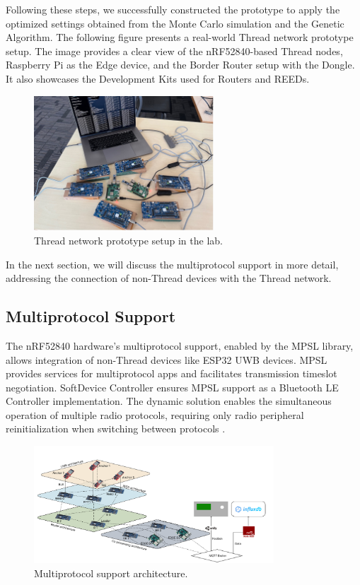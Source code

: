 Following these steps, we successfully constructed the prototype to apply the optimized settings obtained from the Monte Carlo simulation and the Genetic Algorithm. The following figure presents a real-world Thread network prototype setup. The image provides a clear view of the nRF52840-based Thread nodes, Raspberry Pi as the Edge device, and the Border Router setup with the Dongle. It also showcases the Development Kits used for Routers and REEDs.

\begin{figure}[h]
    \centering
    \includegraphics[width=0.6\textwidth]{images/research_design/prototype_setup.jpg}
    \caption{Thread network prototype setup in the lab.}
    \label{fig:prototype_setup}
\end{figure}

In the next section, we will discuss the multiprotocol support in more detail, addressing the connection of non-Thread devices with the Thread network.


\subsection{Multiprotocol Support}\label{sec:multiprotocol_support}
The nRF52840 hardware’s multiprotocol support, enabled by the MPSL library, allows integration of non-Thread devices like ESP32 UWB devices. MPSL provides services for multiprotocol apps and facilitates transmission timeslot negotiation. SoftDevice Controller ensures MPSL support as a Bluetooth LE Controller implementation. The dynamic solution enables the simultaneous operation of multiple radio protocols, requiring only radio peripheral reinitialization when switching between protocols \cite{nordic_multiprotocol_support}.

\begin{figure}[h]
    \centering
    \includegraphics[width=0.8\textwidth]{images/research_design/multiprotocol_support.png}
    \caption{Multiprotocol support architecture.}
    \label{fig:multiprotocol_support}
\end{figure}

